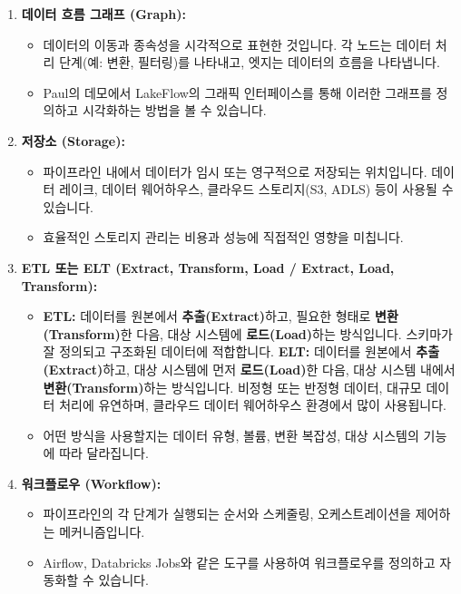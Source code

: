 \documentclass[11pt,a4paper]{article}
\theoremstyle{definition}
\begin{document}
\begin{enumerate}
\begin{enumerate}
    \item \textbf{데이터 흐름 그래프 (Graph):}
    \begin{itemize}
        \item 데이터의 이동과 종속성을 시각적으로 표현한 것입니다. 각 노드는 데이터 처리 단계(예: 변환, 필터링)를 나타내고, 엣지는 데이터의 흐름을 나타냅니다.
        \item Paul의 데모에서 LakeFlow의 그래픽 인터페이스를 통해 이러한 그래프를 정의하고 시각화하는 방법을 볼 수 있습니다.
    \end{itemize}

    \item \textbf{저장소 (Storage):}
    \begin{itemize}
        \item 파이프라인 내에서 데이터가 임시 또는 영구적으로 저장되는 위치입니다. 데이터 레이크, 데이터 웨어하우스, 클라우드 스토리지(S3, ADLS) 등이 사용될 수 있습니다.
        \item 효율적인 스토리지 관리는 비용과 성능에 직접적인 영향을 미칩니다.
    \end{itemize}

    \item \textbf{ETL 또는 ELT (Extract, Transform, Load / Extract, Load, Transform):}
    \begin{itemize}
        \item \textbf{ETL:} 데이터를 원본에서 \textbf{추출(Extract)}하고, 필요한 형태로 \textbf{변환(Transform)}한 다음, 대상 시스템에 \textbf{로드(Load)}하는 방식입니다. 스키마가 잘 정의되고 구조화된 데이터에 적합합니다.
        \textbf{ELT:} 데이터를 원본에서 \textbf{추출(Extract)}하고, 대상 시스템에 먼저 \textbf{로드(Load)}한 다음, 대상 시스템 내에서 \textbf{변환(Transform)}하는 방식입니다. 비정형 또는 반정형 데이터, 대규모 데이터 처리에 유연하며, 클라우드 데이터 웨어하우스 환경에서 많이 사용됩니다.
        \item 어떤 방식을 사용할지는 데이터 유형, 볼륨, 변환 복잡성, 대상 시스템의 기능에 따라 달라집니다.
    \end{itemize}

    \item \textbf{워크플로우 (Workflow):}
    \begin{itemize}
        \item 파이프라인의 각 단계가 실행되는 순서와 스케줄링, 오케스트레이션을 제어하는 메커니즘입니다.
        \item Airflow, Databricks Jobs와 같은 도구를 사용하여 워크플로우를 정의하고 자동화할 수 있습니다.
    \end{itemize}


\end{enumerate}
\end{enumerate}
\end{document}

